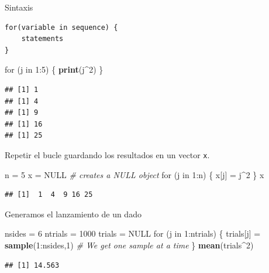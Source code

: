 \documentclass[]{article}
\newenvironment{Shaded}{\begin{snugshade}}{\end{snugshade}}
\newcommand{\KeywordTok}[1]{\textcolor[rgb]{0.13,0.29,0.53}{\textbf{{#1}}}}
\newcommand{\DecValTok}[1]{\textcolor[rgb]{0.00,0.00,0.81}{{#1}}}
\newcommand{\StringTok}[1]{\textcolor[rgb]{0.31,0.60,0.02}{{#1}}}
\newcommand{\CommentTok}[1]{\textcolor[rgb]{0.56,0.35,0.01}{\textit{{#1}}}}
\newcommand{\OtherTok}[1]{\textcolor[rgb]{0.56,0.35,0.01}{{#1}}}
\newcommand{\NormalTok}[1]{{#1}}
\numberwithin{equation}{section}
\begin{document}
Sintaxis

\begin{verbatim}
for(variable in sequence) {
    statements
}
\end{verbatim}

\begin{Shaded}
\begin{Highlighting}[]
\NormalTok{for (j in }\DecValTok{1}\NormalTok{:}\DecValTok{5}\NormalTok{)}
\NormalTok{\{}
  \KeywordTok{print}\NormalTok{(j^}\DecValTok{2}\NormalTok{)}
\NormalTok{\}}
\end{Highlighting}
\end{Shaded}

\begin{verbatim}
## [1] 1
## [1] 4
## [1] 9
## [1] 16
## [1] 25
\end{verbatim}

Repetir el bucle guardando los resultados en un vector \texttt{x}.

\begin{Shaded}
\begin{Highlighting}[]
\NormalTok{n =}\StringTok{ }\DecValTok{5}
\NormalTok{x =}\StringTok{ }\OtherTok{NULL}  \CommentTok{# creates a NULL object}
\NormalTok{for (j in }\DecValTok{1}\NormalTok{:n)}
\NormalTok{\{}
  \NormalTok{x[j] =}\StringTok{ }\NormalTok{j^}\DecValTok{2}
\NormalTok{\}}
\NormalTok{x}
\end{Highlighting}
\end{Shaded}

\begin{verbatim}
## [1]  1  4  9 16 25
\end{verbatim}

Generamos el lanzamiento de un dado

\begin{Shaded}
\begin{Highlighting}[]
\NormalTok{nsides =}\StringTok{ }\DecValTok{6}
\NormalTok{ntrials =}\StringTok{ }\DecValTok{1000}
\NormalTok{trials =}\StringTok{ }\OtherTok{NULL}
\NormalTok{for (j in }\DecValTok{1}\NormalTok{:ntrials)}
\NormalTok{\{}
  \NormalTok{trials[j] =}\StringTok{ }\KeywordTok{sample}\NormalTok{(}\DecValTok{1}\NormalTok{:nsides,}\DecValTok{1}\NormalTok{)  }\CommentTok{# We get one sample at a time}
\NormalTok{\}}
\KeywordTok{mean}\NormalTok{(trials^}\DecValTok{2}\NormalTok{)}
\end{Highlighting}
\end{Shaded}

\begin{verbatim}
## [1] 14.563
\end{verbatim}
\end{document}
